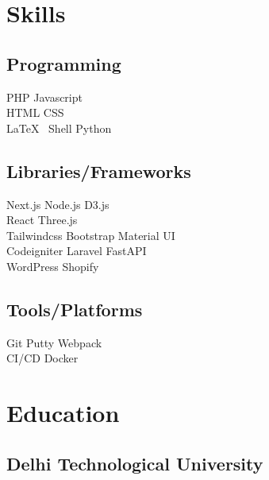 \documentclass[]{standardcv}
\begin{document}
\begin{minipage}[t]{0.25\textwidth} 


\section{Skills}
\subsection{Programming}
\sectionsep
{}
PHP \textbullet{} Javascript \\
\sectionsep
{}
HTML \textbullet{} CSS  \\
\sectionsep
{}
\LaTeX\ \textbullet{}  Shell \textbullet{} Python \\
\sectionsep
\sectionsep
\subsection{Libraries/Frameworks}
\sectionsep
Next.js \textbullet{} Node.js \textbullet{} D3.js \\
React \textbullet{} Three.js \\
Tailwindcss \textbullet{}
Bootstrap \textbullet{} Material UI \\
Codeigniter \textbullet{} Laravel \textbullet{} FastAPI \\
WordPress \textbullet{} Shopify
\sectionsep
\sectionsep
\subsection{Tools/Platforms}
\sectionsep
Git \textbullet{} Putty \textbullet{} Webpack    \\ CI/CD \textbullet{} Docker \\

\sectionsep


\section{Education} 
\subsection{Delhi Technological University}


\end{minipage}
\end{document}
